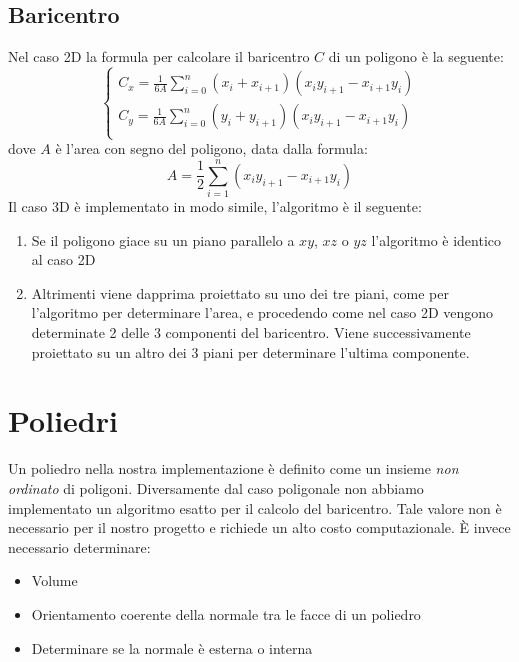 \documentclass[oneside,12pt]{book}  %
\theoremstyle{plain}
\theoremstyle{definition}
\theoremstyle{remark}
\numberwithin{equation}{chapter} %
\begin{document}
\subsection{Baricentro}
Nel caso 2D la formula per calcolare il baricentro $C$ di un poligono
\`e la seguente:
$$
\begin{cases}
C_x=\frac{1}{6A}\sum_{i=0}^{n} (x_i+x_{i+1})(x_iy_{i+1}-x_{i+1}y_i) \\
C_y=\frac{1}{6A}\sum_{i=0}^{n} (y_i+y_{i+1})(x_iy_{i+1}-x_{i+1}y_i) \\
\end{cases}
$$
dove $A$ \`e l'area con segno del poligono, data dalla formula:
$$A=\frac{1}{2} \sum_{i=1}^n (x_iy_{i+1}-x_{i+1}y_i) $$
Il caso 3D \`e implementato in modo simile, l'algoritmo \`e il
seguente:

\begin{enumerate}
\item Se il poligono giace su un piano parallelo a $xy$, $xz$ o
  $yz$ l'algoritmo \`e identico al caso 2D

\item Altrimenti viene dapprima proiettato su uno dei tre piani, come
  per l'algoritmo per determinare l'area, e
 procedendo come nel caso 2D vengono determinate 2 delle 3
  componenti del baricentro. Viene successivamente proiettato su un
  altro dei 3 piani per determinare l'ultima componente.

\end{enumerate}


\section{Poliedri}
Un poliedro nella nostra implementazione \`e definito come un insieme
\textit{non ordinato} di poligoni.
Diversamente dal caso poligonale non abbiamo implementato un algoritmo
esatto per il calcolo del baricentro. Tale valore non \`e necessario
per il nostro progetto e richiede un alto costo computazionale.
\`E invece necessario determinare:
\begin{itemize}
\item Volume
\item Orientamento coerente della normale tra le facce di un poliedro
\item Determinare se la normale \`e esterna o interna
\end{itemize}
\end{document}
